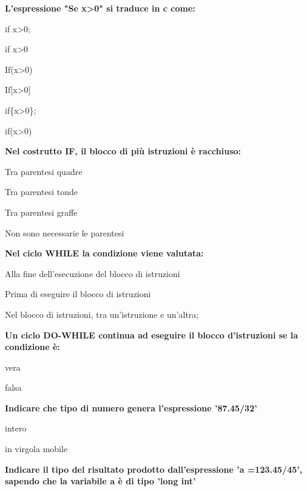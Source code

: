 \documentclass[9pt]{article}
\begin{document}
\begin{enumerate}
{\item {\bf L'espressione "Se x>0" si traduce in c come:}
\item[$\square$]  if x>0;
\item[$\square$]  if x>0
\item[$\square$]  If(x>0)
\item[$\square$]  If[x>0]
\item[$\square$]  if\{x>0\};
\item[$\square$]  if(x>0)

\item [\nonumber]
\item {\bf Nel costrutto IF, il blocco di pi\`{u} istruzioni \`{e} racchiuso:}
\item[$\square$]  Tra parentesi quadre
\item[$\square$]  Tra parentesi tonde
\item[$\square$]  Tra parentesi graffe 
\item[$\square$]  Non sono necessarie le parentesi
\item [\nonumber]

\item {\bf Nel ciclo WHILE la condizione viene valutata:}
\item[$\square$]  Alla fine dell'esecuzione del blocco di istruzioni
\item[$\square$]  Prima di eseguire il blocco di istruzioni
\item[$\square$]  Nel blocco di istruzioni, tra un'istruzione e un'altra; 

\item [\nonumber]
\item {\bf Un ciclo DO-WHILE continua ad eseguire il blocco d'istruzioni se la condizione \`{e}:}
\item [$\square$] vera
\item [$\square$] falsa

\item [\nonumber]
\item{\bf Indicare che tipo di numero genera l'espressione '87.45/32'}

\item[$\square$] intero
\item[$\square$] in virgola mobile

\item [\nonumber]
\item {\bf Indicare il tipo del risultato prodotto dall'espressione 'a =123.45/45', sapendo che la variabile a \`{e} di tipo 'long int'}

}
\end{enumerate}
\end{document}
